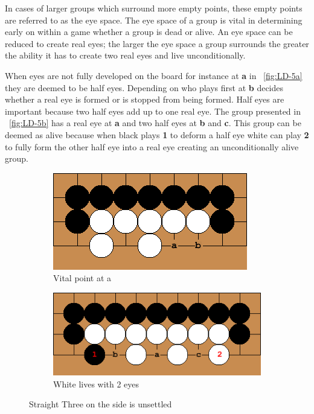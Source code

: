 \documentclass{l4proj}
\newcommand{\bo}[1]{\textbf{#1}}
\begin{document}
In cases of larger groups which surround more empty points, these empty points are referred to as the eye space. The eye space of a group is vital in determining early on within a game whether a group is dead or alive. An eye space can be reduced to create real eyes; the larger the eye space a group surrounds the greater the ability it has to create two real eyes and live unconditionally.

When eyes are not fully developed on the board for instance at \bo{a} in ~\autoref{fig:LD-5a} they are deemed to be half eyes. Depending on who plays first at \bo{b} decides whether a real eye is formed or is stopped from being formed. Half eyes are important because two half eyes add up to one real eye.  The group presented in ~\autoref{fig:LD-5b} has a real eye at \bo{a} and two half eyes at \bo{b} and \bo{c}. This group can be deemed as alive because when black plays \bo{1} to deform a half eye white can play \bo{2} to fully form the other half eye into a real eye creating an unconditionally alive group.

\begin{figure}[!ht]
\centering
\begin{subfigure}[b]{0.4\textwidth}
\includegraphics[width=\textwidth]{LD/5a.png}
\caption{Vital point at a}
\label{fig:LD-5a}
\end{subfigure}\qquad
\begin{subfigure}[b]{0.5\textwidth}
\includegraphics[width=\textwidth]{LD/5b.png}
\caption{White lives with 2 eyes}
\label{fig:LD-5b}
\end{subfigure}
\caption{Straight Three on the side is unsettled}
\label{fig:LD-5}
\end{figure}
\end{document}
